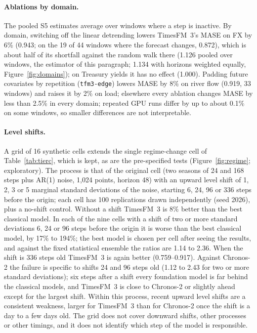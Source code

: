\paragraph{Ablations by domain.} The pooled S5 estimates average over windows where a step is inactive. By domain, switching off the
linear detrending lowers TimesFM~3's MASE on FX by 6\% (0.943; on the 19 of 44 windows where the forecast changes, 0.872), which is
about half of its shortfall against the random walk there (1.126 pooled over windows, the estimator of this paragraph; 1.134 with
horizons weighted equally, Figure~\ref{fig:domains}); on Treasury yields it has no effect (1.000). Padding future covariates by repetition (\texttt{tfm3-edge}) lowers MASE by 8\% on river flow (0.919, 33 windows) and raises
it by 2\% on load; elsewhere every ablation changes MASE by less than 2.5\% in every domain; repeated GPU runs differ by up to about 0.1\% on some windows, so smaller
differences are not interpretable.

\paragraph{Level shifts.} A grid of 16 synthetic cells extends the single regime-change cell of Table~\ref{tab:tierc}, which
is kept, as are the pre-specified tests (Figure~\ref{fig:regime}; exploratory). The process is that of the original cell (two
seasons of 24 and 168 steps plus AR(1) noise, 1{,}024 points, horizon 48) with an upward level shift of 1, 2, 3 or 5 marginal
standard deviations of the noise, starting 6, 24, 96 or 336 steps before the origin; each cell has 100 replications drawn
independently (seed 2026), plus a no-shift control. Without a shift TimesFM~3 is 8\% better than the best classical model. In each
of the nine cells with a shift of two or more standard deviations 6, 24 or 96 steps before the origin it is worse than the best
classical model, by 17\% to 194\%; the best model is chosen per cell after seeing the results, and against the fixed statistical
ensemble the ratios are 1.14 to 2.36. When the shift is 336 steps old TimesFM~3 is again better (0.759--0.917). Against Chronos-2 the failure is
specific to shifts 24 and 96 steps old (1.12 to 2.43 for two or more standard deviations); six steps after a shift every foundation
model is far behind the classical models, and TimesFM~3 is close to Chronos-2 or slightly ahead except for the largest shift.
Within this process, recent upward level shifts are a consistent weakness, larger for TimesFM~3 than for Chronos-2 once the shift is
a day to a few days old. The grid does not cover downward shifts, other processes or other timings, and it does not identify which
step of the model is responsible.

